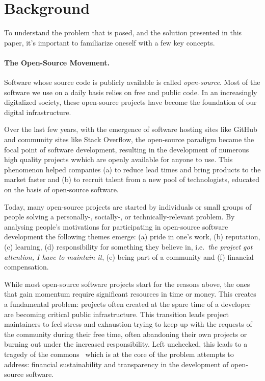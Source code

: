 \section{Background}

To understand the problem that is posed, and the solution presented in this
paper, it's important to familiarize oneself with a few key concepts.

\paragraph{The Open-Source Movement.} Software whose source code is publicly
available is called \emph{open-source}. Most of the software we use on a daily
basis relies on free and public code. In an increasingly digitalized society,
these open-source projects have become the foundation of our digital
infrastructure.

Over the last few years, with the emergence of software hosting sites like
GitHub and community sites like Stack Overflow, the open-source paradigm became
the focal point of software development, resulting in the development of
numerous high quality projects wwhich are openly available for anyone to use.
This phenomenon helped companies (a) to reduce lead times and bring products to
the market faster and (b) to recruit talent from a new pool of technologists,
educated on the basis of open-source software.

Today, many open-source projects are started by individuals or small groups of
people solving a personally-, socially-, or technically-relevant problem. By
analysing people's motivations for participating in open-source software
development the following themes emerge: (a) pride in one's work, (b)
reputation, (c) learning, (d) responsibility for something they believe in,
i.e.\ \emph{the project got attention, I have to maintain it}, (e) being part
of a community and (f) financial compensation.

While most open-source software projects start for the reasons above, the ones
that gain momentum require significant resources in time or money. This creates
a fundamental problem: projects often created at the spare time of a developer
are becoming critical public infrastructure. This transition leads project
maintainers to feel stress and exhaustion trying to keep up with the requests
of the community during their free time, often abandoning their own projects or
burning out under the increased responsibility. Left unchecked, this leads to a
tragedy of the commons~\cite{tragedy-commons} which is at the core of the
problem \oscoin{} attempts to address: financial sustainability and
transparency in the development of open-source software.

